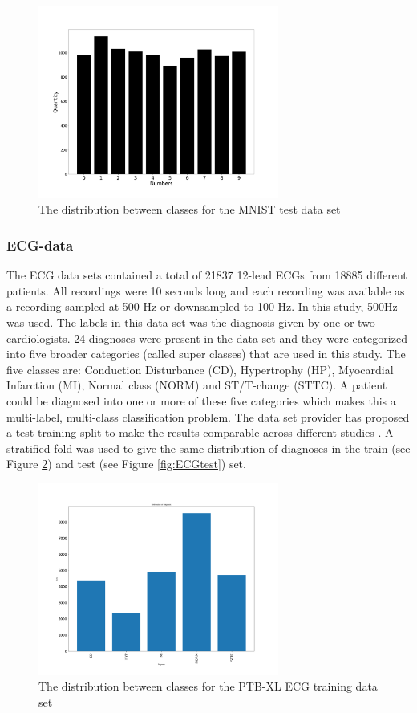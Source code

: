\documentclass[twocolumn]{cinc}
\begin{document}
\begin{figure}[!htbp]
\includegraphics[width=7.9cm]{Figures/MNIST_test_data.png}
\caption{The distribution between classes for the MNIST test data set}
\label{fig:MNISTtest}
\end{figure}


\subsubsection{ECG-data}
The ECG data sets contained a total of 21837 12-lead ECGs from 18885 different patients. All recordings were 10 seconds long and each recording was available as a recording sampled at 500 Hz or downsampled to 100 Hz. In this study, 500Hz was used. The labels in
this data set was the diagnosis given by one or two cardiologists. 24 diagnoses were present in the data set and they were categorized into five broader categories (called super classes) that are used in this study. The five classes are: Conduction Disturbance (CD), Hypertrophy (HP), Myocardial Infarction (MI), Normal class (NORM) and ST/T-change (STTC). A patient could be diagnosed into one or more of these five categories which makes this a multi-label, multi-class classification problem. The data set provider has proposed a test-training-split to make the results comparable across different studies \cite{wagner_ptb-xl_2020}. A stratified fold was used to give the same distribution of diagnoses in the train (see Figure \ref{fig:ECGtrain}) and test (see Figure \ref{fig:ECGtest}) set.

\begin{figure}[!htb]
\includegraphics[width=7.9cm]{Figures/distribution_training.png}
\caption{The distribution between classes for the PTB-XL ECG training data set}
\label{fig:ECGtrain}
\end{figure}
\end{document}
